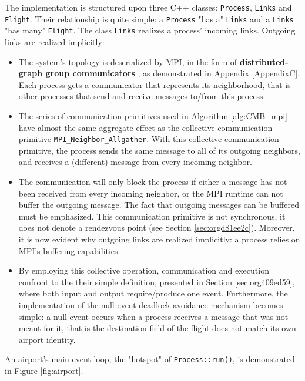\documentclass[11pt]{article}
\begin{document}
The implementation is structured upon three C++ classes: \texttt{Process}, \texttt{Links} and \texttt{Flight}. 
Their relationship is quite simple: a \texttt{Process} "has a" \texttt{Links} and a \texttt{Links} "has many" \texttt{Flight}.
The class \texttt{Links} realizes a process' incoming links.
Outgoing links are realized implicitly: 
\begin{itemize}
\item The system's topology is deserialized by MPI, in the form  of \textbf{distributed-graph group communicators} \cite{MessagePassingInterfaceForum2012}, as demonstrated in Appendix \ref{AppendixC}.
Each process gets a communicator that represents its neighborhood, that is other processes that send and receive messages to/from this process.
\item The series of communication primitives used in Algorithm \ref{alg:CMB_mpi} have almost the same aggregate effect as the collective communication primitive \texttt{MPI\_Neighbor\_Allgather}.
With this collective communication primitive, the process sends the same message to all of its outgoing neighbors, and receives a (different) message from every incoming neighbor.
\item The communication will only block the process if either a message has not been received from every incoming neighbor, or the MPI runtime can not buffer the outgoing message.
The fact that outgoing messages can be buffered must be emphasized. 
This communication primitive is not synchronous, it does not denote a rendezvous point (see Section \ref{sec:orgd81ee2c}).
Moreover, it is now evident why outgoing links are realized implicitly: a process relies on MPI's buffering capabilities.
\item By employing this collective operation, communication and execution confront to the their simple definition, presented in Section \ref{sec:org409ed59}, where both input and output require/produce one event.
Furthermore, the implementation of the null-event deadlock avoidance mechanism becomes simple: a null-event occurs when a process receives a message that was not meant for it, that is the destination field of the flight does not match its own airport identity.
\end{itemize}
An airport's main event loop, the "hotspot" of \texttt{Process::run()}, is demonstrated in Figure \ref{fig:airport}.
\end{document}
